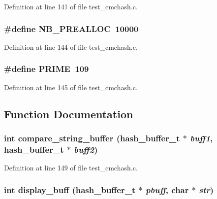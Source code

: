 Definition at line 141 of file test\_\-cmchash.c.
\subsubsection[{NB\_\-PREALLOC}]{\setlength{\rightskip}{0pt plus 5cm}\#define NB\_\-PREALLOC~10000}\label{test__cmchash_8c_86ddf7c36b9a7e599bb04786c61b0370}




Definition at line 144 of file test\_\-cmchash.c.
\subsubsection[{PRIME}]{\setlength{\rightskip}{0pt plus 5cm}\#define PRIME~109}\label{test__cmchash_8c_c4add2a227a10511e0128d63952030e8}




Definition at line 145 of file test\_\-cmchash.c.

\subsection{Function Documentation}
\subsubsection[{compare\_\-string\_\-buffer}]{\setlength{\rightskip}{0pt plus 5cm}int compare\_\-string\_\-buffer (hash\_\-buffer\_\-t $\ast$ {\em buff1}, \/  hash\_\-buffer\_\-t $\ast$ {\em buff2})}\label{test__cmchash_8c_f183d0c5e0c482d0f02845db8a2f785c}




Definition at line 149 of file test\_\-cmchash.c.
\subsubsection[{display\_\-buff}]{\setlength{\rightskip}{0pt plus 5cm}int display\_\-buff (hash\_\-buffer\_\-t $\ast$ {\em pbuff}, \/  char $\ast$ {\em str})}\label{test__cmchash_8c_d9a0e7d500dc83e14095e7c90c40c5b9}




